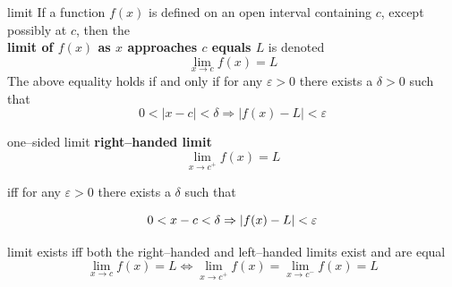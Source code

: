 \documentclass[avery5371,grid]{flashcards}
\begin{document}
\begin{flashcard}[Definition]{limit}
If a function $f(x)$ is defined on an open interval containing $c$, except
possibly at $c$, then the \\
\textbf{limit of $f(x)$ as $x$ approaches $c$ equals $L$} 
is denoted
\begin{equation*}
\lim_{x\rightarrow c} f(x) = L
\end{equation*}
The above equality holds if and only if for any 
$\varepsilon > 0$ there exists a $\delta > 0$ such that
\begin{equation*}
0<|x-c|<\delta \Rightarrow |f(x) - L|<\varepsilon
\end{equation*}
\end{flashcard}

\begin{flashcard}[Definition]{one--sided limit}
\textbf{right--handed limit}
\begin{equation*}
\lim_{x\rightarrow c^{+}} f(x) = L
\end{equation*}
\begin{center}
iff for any $\varepsilon>0$ there exists a $\delta$ such that\\
\end{center}
\begin{equation*}
0<x-c<\delta \Rightarrow |f(x)-L|<\varepsilon\\
\end{equation*}
\end{flashcard}

\begin{flashcard}[Theorem]{limit exists iff both the right--handed
and left--handed limits exist and are equal}
\begin{equation*}
\lim_{x\rightarrow c}f(x) = L \Leftrightarrow
\lim_{x\rightarrow c^{+}} f(x) = \lim_{x\rightarrow c^{-}} f(x) = L
\end{equation*}
\end{flashcard}
\end{document}
